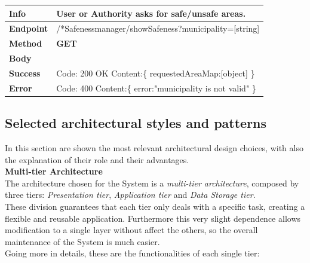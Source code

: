 \begin{table}[H]
\begin{tabular}{|l|p{}|}
\hline
\textbf{Info}             & User or Authority asks for safe/unsafe areas.                                                        \\ \hline
\textbf{Endpoint}    &  /*Safenessmanager/showSafeness?municipality=[string] \\ \hline
\textbf{Method}         &   \textbf{GET}                                                                            \\ \hline

\textbf{Body}  & 
                    \\ \hline
                    
\textbf{Success} &  Code: 200 OK \newline
                    Content:\{\newline 
            requestedAreaMap:[object]\newline
                    \}\\ \hline
\textbf{Error} &
                   Code: 400 \newline
                  Content:\{\newline
                  error:"municipality is not valid" \newline\}
                  
                \\\hline

\end{tabular}
\end{table}



\subsection{Selected architectural styles and patterns}
In this section are shown the most relevant architectural design choices, with also the explanation of their role and their advantages.\\

\noindent \textbf{Multi-tier Architecture}\\
The architecture chosen for the System is a \textit{multi-tier architecture}, composed by three tiers: \textit{Presentation tier}, \textit{Application tier} and \textit{Data Storage tier}.\\
These division guarantees that each tier only deals with a specific task, creating a flexible and reusable application. Furthermore this very slight dependence allows modification to a single layer without affect the others, so the overall maintenance of the System is much easier.\\
Going more in details, these are the functionalities of each single tier:

